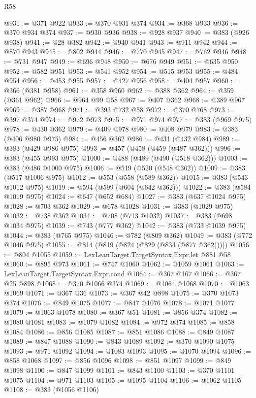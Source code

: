 \begin{lexlean}{R58}
\begin{coremodule}
@931 := @371 @922
@933 := @370 @931 @374
@934 := @368 @933
@936 := @370 @934 @374
@937 := @930 @936
@938 := @928 @937
@940 := @383 (@926 @938)
@941 := @28 @382
@942 := @940 @941
@943 := @911 @942
@944 := @870 @943
@945 := @802 @944
@946 := @770 @945
@947 := @762 @946
@948 := @731 @947
@949 := @696 @948
@950 := @676 @949
@951 := @635 @950
@952 := @582 @951
@953 := @541 @952
@954 := @515 @953
@955 := @484 @954
@956 := @453 @955
@957 := @427 @956
@958 := @404 @957
@960 := @366 (@381 @958)
@961 := @358 @960
@962 := @388 @362
@964 := @359 (@361 @962)
@966 := @964 @99 @58
@967 := @407 @362
@968 := @389 @967
@969 := @387 @968
@971 := @393 @732 @58
@972 := @370 @768
@973 := @397 @374
@974 := @972 @973
@975 := @971 @974
@977 := @383 (@969 @975)
@978 := @430 @362
@979 := @409 @978
@980 := @408 @979
@983 := @383 (@406 @980 @975)
@984 := @456 @362
@986 := @431 (@432 @984)
@989 := @383 (@429 @986 @975)
@993 := @457 (@458 (@459 (@487 @362)))
@996 := @383 (@455 @993 @975)
@1000 := @488 (@489 (@490 (@518 @362)))
@1003 := @383 (@486 @1000 @975)
@1006 := @519 (@520 (@548 @362))
@1009 := @383 (@517 @1006 @975)
@1012 := @553 (@558 (@589 @362))
@1015 := @383 (@543 @1012 @975)
@1019 := @594 (@599 (@604 (@642 @362)))
@1022 := @383 (@584 @1019 @975)
@1024 := @647 (@652 @684)
@1027 := @383 (@637 @1024 @975)
@1028 := @703 @362
@1029 := @678 @1028
@1031 := @383 (@1029 @975)
@1032 := @738 @362
@1034 := @708 (@713 @1032)
@1037 := @383 (@698 @1034 @975)
@1039 := @743 (@777 @362)
@1042 := @383 (@733 @1039 @975)
@1044 := @383 (@765 @975)
@1046 := @782 (@809 @362)
@1049 := @383 (@772 @1046 @975)
@1055 := @814 (@819 (@824 (@829 (@834 (@877 @362)))))
@1056 := @804 @1055
@1059 := LexLeanTarget.TargetSyntax.Expr.let @881 @58
@1060 := @895 @973
@1061 := @747 @1060
@1062 := @1059 @1061
@1063 := LexLeanTarget.TargetSyntax.Expr.cond
@1064 := @367 @167
@1066 := @367 @25 @898
@1068 := @370 @1066 @374
@1069 := @1064 @1068
@1070 := @1063 @1069
@1071 := @367 @36
@1073 := @367 @42 @898
@1075 := @370 @1073 @374
@1076 := @849 @1075
@1077 := @847 @1076
@1078 := @1071 @1077
@1079 := @1063 @1078
@1080 := @367 @51
@1081 := @856 @374
@1082 := @1080 @1081
@1083 := @1079 @1082
@1084 := @972 @374
@1085 := @858 @1084
@1086 := @856 @1085
@1087 := @851 @1086
@1088 := @849 @1087
@1089 := @847 @1088
@1090 := @843 @1089
@1092 := @370 @1090 @1075
@1093 := @971 @1092
@1094 := @1083 @1093
@1095 := @1070 @1094
@1096 := @858 @1068
@1097 := @856 @1096
@1098 := @851 @1097
@1099 := @849 @1098
@1100 := @847 @1099
@1101 := @843 @1100
@1103 := @370 @1101 @1075
@1104 := @971 @1103
@1105 := @1095 @1104
@1106 := @1062 @1105
@1108 := @383 (@1056 @1106)

\end{coremodule}
\end{lexlean}
